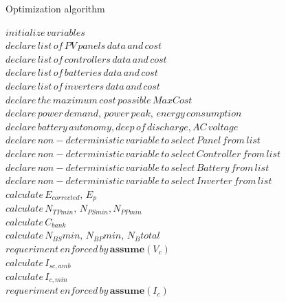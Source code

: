 \documentclass[10pt,conference]{IEEEtran}
\begin{document}
 \begin{algorithm}
 \caption{Optimization algorithm}
 \begin{algorithmic}[1]
 \begin{scriptsize}
 
 \renewcommand{\algorithmicrequire}{\textbf{Input:}}
 \renewcommand{\algorithmicensure}{\textbf{Output:}}
  \STATE $initialize \, variables$ \\
  \STATE $declare \, list \, of \, PV \, panels \, data \, and \, cost $ \\
  \STATE $declare \, list \, of \, controllers \, data \, and \, cost $ \\
  \STATE $declare \, list \, of \, batteries \, data \,  and \, cost $ \\
  \STATE $declare \, list \, of \, inverters \, data \,  and \, cost $ \\
  \STATE $declare \, the \, maximum \, cost \, possible \, MaxCost $  \\
  \STATE $declare \, power \, demand, \, power \, peak, \, energy \, consumption $ \\
  \STATE $declare \, battery\,  autonomy, deep \, of \, discharge, AC \, voltage$ \\
 	\STATE $declare \, non-deterministic \, variable \, to \, select \, Panel \, from \, list$ \\
 	\STATE $declare \, non-deterministic \, variable \, to \, select \, Controller \, from \, list $ \\
 	\STATE $declare \, non-deterministic \, variable \, to \, select \, Battery \, from \, list $ \\
 	\STATE $declare \, non-deterministic \, variable \, to \, select \, Inverter \, from \, list $ \\ 	
 	\STATE $calculate \, E_{corrected}, \, E_{p} $ \\
	\STATE $calculate \, N_{TPmin}, \, N_{PSmin}, N_{PPmin} $ \\
 	\STATE $calculate \, C_{bank}$ \\
	\STATE $calculate \, N_{BS}min, \, N_{BP}min, \, N_{B}total$ \\
	\STATE $requeriment \, enforced \, by \, \textbf{assume}(V_{c})$ \\
 	\STATE $calculate \, I_{sc,amb}$ \\
 	\STATE $calculate \, I_{c,min}$ \\
 	\STATE $requeriment \, enforced \, by \, \textbf{assume}(I_{c})$ \\

\end{scriptsize}
\end{algorithmic}
\end{algorithm}
\end{document}
